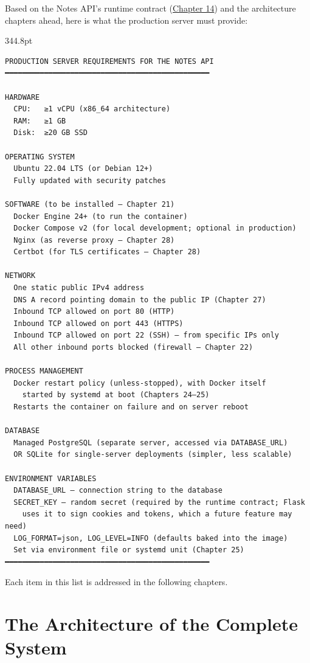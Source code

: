 Based on the Notes API's runtime contract (\hyperref[ch:14-runtime-contract]{Chapter 14}) and the architecture chapters ahead, here is what the production server must provide:

\begin{diagrambox}[short]{344.8pt}
\begin{Verbatim}[fontsize=\fontsize{9.0}{8.55}\selectfont]
PRODUCTION SERVER REQUIREMENTS FOR THE NOTES API
━━━━━━━━━━━━━━━━━━━━━━━━━━━━━━━━━━━━━━━━━━━━━━━

HARDWARE
  CPU:   ≥1 vCPU (x86_64 architecture)
  RAM:   ≥1 GB
  Disk:  ≥20 GB SSD

OPERATING SYSTEM
  Ubuntu 22.04 LTS (or Debian 12+)
  Fully updated with security patches

SOFTWARE (to be installed — Chapter 21)
  Docker Engine 24+ (to run the container)
  Docker Compose v2 (for local development; optional in production)
  Nginx (as reverse proxy — Chapter 28)
  Certbot (for TLS certificates — Chapter 28)

NETWORK
  One static public IPv4 address
  DNS A record pointing domain to the public IP (Chapter 27)
  Inbound TCP allowed on port 80 (HTTP)
  Inbound TCP allowed on port 443 (HTTPS)
  Inbound TCP allowed on port 22 (SSH) — from specific IPs only
  All other inbound ports blocked (firewall — Chapter 22)

PROCESS MANAGEMENT
  Docker restart policy (unless-stopped), with Docker itself
    started by systemd at boot (Chapters 24–25)
  Restarts the container on failure and on server reboot

DATABASE
  Managed PostgreSQL (separate server, accessed via DATABASE_URL)
  OR SQLite for single-server deployments (simpler, less scalable)

ENVIRONMENT VARIABLES
  DATABASE_URL — connection string to the database
  SECRET_KEY — random secret (required by the runtime contract; Flask
    uses it to sign cookies and tokens, which a future feature may need)
  LOG_FORMAT=json, LOG_LEVEL=INFO (defaults baked into the image)
  Set via environment file or systemd unit (Chapter 25)
━━━━━━━━━━━━━━━━━━━━━━━━━━━━━━━━━━━━━━━━━━━━━━━
\end{Verbatim}
\end{diagrambox}

\noindent{}Each item in this list is addressed in the following chapters.

\setcounter{section}{8}
\section{The Architecture of the Complete System}\label{20-server-fundamentals:209-the-architecture-of-the-complete-system}

